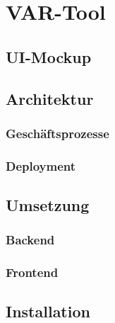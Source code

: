 \chapter{VAR-Tool}
\label{ch:main-matter}
\section{UI-Mockup}
\section{Architektur}
\subsection{Geschäftsprozesse}
\subsection{Deployment}
\section{Umsetzung}
\subsection{Backend}
\subsection{Frontend}
\section{Installation}

